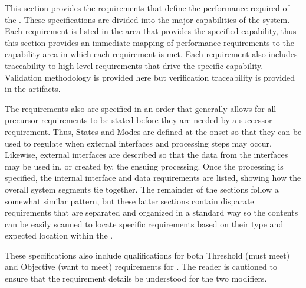 
This section provides the requirements that define the performance required of the \ThisSys.
These specifications are divided into the major capabilities of the system.
Each requirement is listed in the area that provides the specified capability, thus this section provides an immediate mapping of performance requirements to the capability area in which each requirement is met.
Each requirement also includes traceability to high-level requirements that drive the specific capability.
Validation methodology is provided here but verification traceability is provided in the \STS artifacts.


The requirements also are specified in an order that generally allows for all precursor requirements to be stated before they are needed by a successor requirement.
Thus, States and Modes are defined at the onset so that they can be used to regulate when external interfaces and processing steps may occur.
Likewise, external interfaces are described so that the data from the interfaces may be used in, or created by, the ensuing processing.
Once the processing is specified, the internal interface and data requirements are listed, showing how the overall system segments tie together.
The remainder of the sections follow a somewhat similar pattern, but these latter sections contain disparate requirements that are separated and organized in a standard way so the contents can be easily scanned to locate specific requirements based on their type and expected location within the \SPS.

These specifications also include qualifications for both Threshold (must meet) and Objective (want to meet) requirements for \ThisSys.
The reader is cautioned to ensure that the requirement details be understood for the two modifiers.
